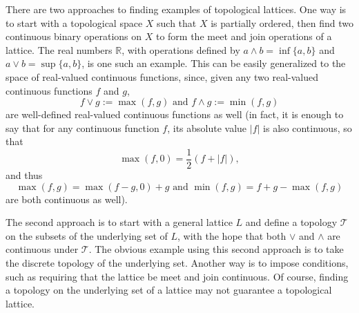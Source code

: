 \documentclass[12pt]{article}
\begin{document}
\begin{itemize}
\end{itemize}

There are two approaches to finding examples of topological lattices.  One way is to start with a topological space $X$ such that $X$ is partially ordered, then find two continuous binary operations on $X$ to form the meet and join operations of a lattice.  The real numbers $\mathbb{R}$, with operations defined by $a\wedge b= \operatorname{inf}\lbrace a,b\rbrace$ and $a\vee b =\operatorname{sup}\lbrace a,b\rbrace$, is one such an example.  This can be easily generalized to the space of real-valued continuous functions, since, given any two real-valued continuous functions $f$ and $g$, 
$$f\vee g:=\max(f,g)\mbox{ and }f\wedge g:=\min(f,g)$$ 
are well-defined real-valued continuous functions as well (in fact, it is enough to say that for any continuous function $f$, its absolute value $|f|$ is also continuous, so that $$\max(f,0)=\frac{1}{2}(f+|f|),$$ and thus $$\max(f,g)= \max(f-g,0)+g\mbox{ and }\min(f,g)=f+g-\max(f,g)$$ are both continuous as well).

The second approach is to start with a general lattice $L$ and define a topology $\mathcal{T}$ on the subsets of the underlying set of $L$, with the hope that both $\vee$ and $\wedge$ are continuous under $\mathcal{T}$.  The obvious example using this second approach is to take the discrete topology of the underlying set.  Another way is to impose conditions, such as requiring that the lattice be meet and join continuous.  Of course, finding a topology on the underlying set of a lattice may not guarantee a topological lattice.
\end{document}
